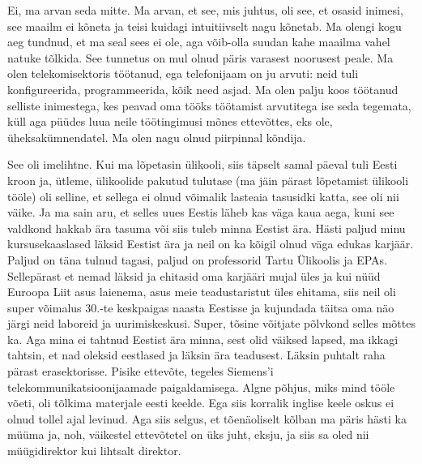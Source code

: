 
Ei, ma arvan seda mitte. Ma arvan, et see, mis juhtus, oli see, et osasid 
inimesi, see maailm ei kõneta ja teisi kuidagi intuitiivselt nagu kõnetab. Ma 
olengi kogu aeg tundnud, et ma seal sees ei ole, aga võib-olla suudan kahe 
maailma vahel natuke tõlkida. See tunnetus on mul olnud päris varasest 
noorusest peale. Ma olen telekomisektoris töötanud, ega  telefonijaam on ju 
arvuti: neid tuli konfigureerida, programmeerida, kõik need asjad. Ma olen 
palju koos töötanud selliste inimestega, kes peavad oma tööks töötamist 
arvutitega ise seda tegemata, küll aga püüdes luua neile töötingimusi mõnes 
ettevõttes, eks ole, üheksakümnendatel. Ma olen nagu olnud piirpinnal kõndija.


See oli imelihtne. Kui ma lõpetasin ülikooli, siis täpselt samal päeval tuli 
Eesti kroon ja, ütleme, ülikoolide pakutud tulutase 
(ma jäin pärast lõpetamist ülikooli tööle) oli selline, et sellega ei olnud 
võimalik lasteaia tasusidki katta, see oli nii väike. Ja ma sain aru, et selles 
uues Eestis läheb kas väga kaua aega, kuni see valdkond hakkab ära tasuma või 
siis tuleb minna Eestist ära. Hästi paljud minu kursusekaaslased läksid Eestist 
ära ja neil on ka kõigil olnud väga edukas karjäär. Paljud on täna tulnud 
tagasi, paljud on professorid Tartu Ülikoolis ja EPAs. Sellepärast et nemad 
läksid ja ehitasid oma karjääri mujal üles ja kui nüüd Euroopa Liit asus 
laienema, asus meie teadustaristut üles ehitama, siis neil oli super võimalus 
30.-te keskpaigas naasta Eestisse ja kujundada täitsa oma näo järgi neid 
laboreid ja uurimiskeskusi. Super, tõsine võitjate põlvkond selles mõttes ka. 
Aga mina ei tahtnud Eestist ära minna, sest olid väiksed lapsed, ma ikkagi 
tahtsin, et nad oleksid eestlased ja  läksin ära teadusest. Läksin  puhtalt 
raha pärast erasektorisse. Pisike ettevõte, tegeles Siemens'i 
telekommunikatsioonijaamade paigaldamisega. Algne põhjus, miks mind tööle 
võeti, oli tõlkima materjale eesti keelde. Ega siis korralik inglise keele 
oskus ei olnud tollel ajal levinud. Aga siis selgus, et tõenäoliselt kõlban ma 
päris hästi ka müüma ja, noh, väikestel ettevõtetel on üks juht, eksju, ja siis 
sa oled nii müügidirektor kui lihtsalt direktor. 

